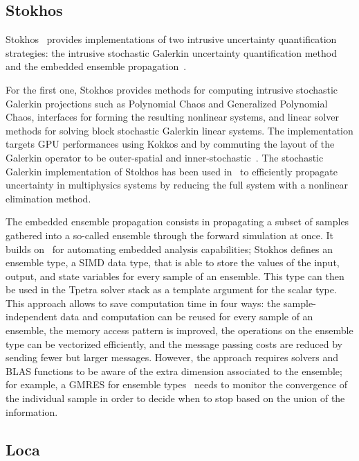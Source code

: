 \subsection{Stokhos}

Stokhos~\cite{phipps2015stokhos,Phipps2016,phipps2014exploring} provides implementations of two intrusive uncertainty quantification strategies: 
the intrusive stochastic Galerkin uncertainty quantification method~\cite{ghanem1990polynomial,ghanem2003stochastic} and the embedded ensemble propagation~\cite{phipps2017embedded}.

For the first one, Stokhos provides methods for computing intrusive stochastic Galerkin projections such as Polynomial Chaos and Generalized Polynomial Chaos, 
interfaces for forming the resulting nonlinear systems, and linear solver methods for solving block stochastic Galerkin linear systems.
The implementation targets GPU performances using Kokkos and by commuting the layout of the Galerkin operator to be outer-spatial and inner-stochastic~\cite{phipps2014exploring}.
The stochastic Galerkin implementation of Stokhos has been used in~\cite{constantine2014efficient} to efficiently propagate uncertainty in multiphysics systems by reducing the full system with a nonlinear elimination method.


The embedded ensemble propagation consists in propagating a subset of samples gathered into a so-called ensemble through the forward simulation at once.
It builds on~\cite{pawlowski2012automating} for automating embedded analysis capabilities; Stokhos defines an ensemble type, a SIMD data type, that is able to store
the values of the input, output, and state variables for every sample of an ensemble. This type can then be used in the Tpetra solver stack as a template argument for the scalar type.
This approach allows to save computation time in four ways: the sample-independent data and computation can be reused for every sample of an ensemble, the memory access pattern is improved,
the operations on the ensemble type can be vectorized efficiently, and the message passing costs are reduced by sending fewer but larger messages.
However, the approach requires solvers and BLAS functions to be aware of the extra dimension associated to the ensemble; for example, a GMRES for ensemble types~\cite{liegeois2020gmres} needs to monitor 
the convergence of the individual sample in order to decide when to stop based on the union of the information.


\subsection{Loca}
